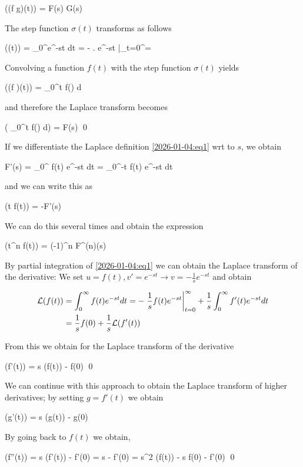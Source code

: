 \bee
\Lc((f \star g)(t)) = F(s) G(s)
\eee

The step function $\sigma(t)$ transforms as follows

\bee
\Lc(\sigma(t)) = \int_0^\infty e^{-st} dt = - \left.  e^{-st} \right|_{t=0}^\infty = 
\eee

Convolving a function $f(t)$ with the step function $\sigma(t)$ yields

\bee
\Lc((f \star \sigma)(t)) = \int_0^t f(\tau) d\tau
\eee

and therefore the Laplace transform becomes

\bee
\Lc \left( \int_0^t f(\tau) d\tau \right) =  F(s) \qed
\eee

If we differentiate the Laplace definition \eqref{2026-01-04:eq1} wrt to $s$, we obtain

\bee
F'(s) = \int_0^\infty {} f(t) e^{-st} dt = \int_0^\infty -t f(t) e^{-st} dt
\eee

and we can write this as

\bee
\Lc(t f(t)) = -F'(s)
\eee

We can do this several times and obtain the expression

\bee
\Lc(t^n f(t)) = (-1)^n F^{(n)}(s)
\eee

By partial integration of \eqref{2026-01-04:eq1} we can obtain the Laplace transform of the derivative: We set $u = f(t), v' = e^{-st} \rightarrow v = - \frac{1}{s} e^{-st}$ and obtain

\begin{align*}
\mathcal{L}( f(t)) &= \int_0^\infty f(t) e^{-st} dt = - \left.\frac{1}{s} f(t) e^{-st}\right|_{t=0}^\infty + \frac{1}{s} \int_0^\infty f'(t) e^{-st} dt \\
&= \frac{1}{s} f(0) + \frac{1}{s} \mathcal{L}( f'(t))
\end{align*}

From this we obtain for the Laplace transform of the derivative

\bee
\Lc(f'(t)) = s \Lc(f(t)) - f(0) \qed
\eee

We can continue with this approach to obtain the Laplace transform of higher derivatives; by setting $g = f'(t)$ we obtain

\bee
\Lc(g'(t)) = s \Lc(g(t)) - g(0)
\eee

By going back to $f(t)$ we obtain,

\bee
\Lc(f''(t)) = s \Lc(f'(t)) - f'(0) = s \left[ s \Lc(f(t)) - f(0)\right] - f'(0) = s^2 \Lc(f(t)) - s f(0) - f'(0) \qed
\eee

